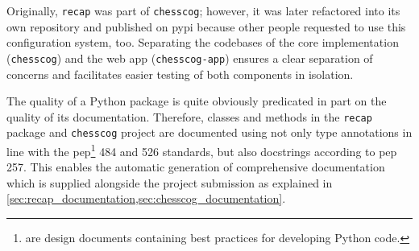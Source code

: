\documentclass[../report.tex]{subfiles}
\begin{document}
Originally, \texttt{recap} was part of \texttt{chesscog}; however, it was later refactored into its own repository and published on \gls{pypi} because other people requested to use this configuration system, too.
Separating the codebases of the core implementation (\texttt{chesscog}) and the web app (\texttt{chesscog-app}) ensures a clear separation of concerns and facilitates easier testing of both components in isolation.

The quality of a Python package is quite obviously predicated in part on the quality of its documentation.
Therefore, classes and methods in the \texttt{recap} package and \texttt{chesscog} project are documented using not only type annotations in line with the \gls{pep}\footnote{ are design documents containing best practices for developing Python code.} 484 and 526 standards, but also docstrings according to \gls{pep} 257.
This enables the automatic generation of comprehensive documentation which is supplied alongside the project submission as explained in \cref{sec:recap_documentation,sec:chesscog_documentation}.
\end{document}
